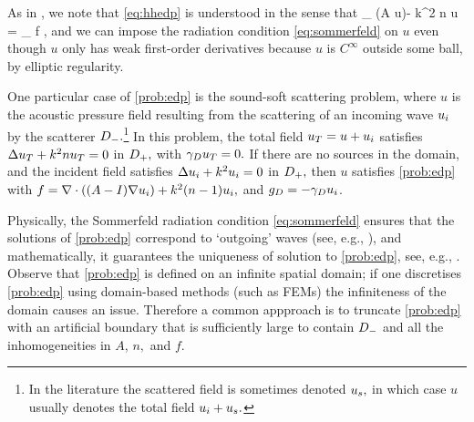 As in \cite[pp. 2874-2875]{GrPeSp:19}, we note that \cref{eq:hhedp} is understood in the sense that
\beqs
\int_{\Dp} \mleft(A \grad u\mright)\cdot \grad \phibar - k^2 n u \phibar = \int_{\Dp} f \phibar {} \phi \in \CzinftyDp,
\eeqs
and we can impose the radiation condition \cref{eq:sommerfeld} on $u$ even though $u$ only has weak first-order derivatives because $u$ is $C^\infty$ outside some ball, by elliptic regularity.

One particular case of \cref{prob:edp} is the sound-soft scattering problem, where $u$ is the acoustic pressure field resulting from the scattering of an incoming wave $u_{i}$ by the scatterer $D_{-}.$\footnote{In the literature the scattered field is sometimes denoted $u_{s},$ in which case $u$ usually denotes the total field $u_{i}+ u_{s}.$} In this problem, the total field $u_{T} = u + u_{i}$ satisfies $\Delta u_{T} + k^2nu_{T} = 0$ in $D_{+},$ with $\gamma_{D} u_{T} = 0.$ If there are no sources in the domain, and the incident field satisfies $\Delta u_{i} + k^2 u_{i} = 0$ in $D_{+},$ then $u$ satisfies \cref{prob:edp} with $f = \grad \cdot \mleft(\mleft(A-I\mright) \grad \ui\mright) + k^2 \mleft(n-1\mright)\ui,$ and $g_{D} = - \gamma_{D} u_{i}$.

Physically, the Sommerfeld radiation condition \eqref{eq:sommerfeld} ensures that the solutions of \cref{prob:edp} correspond to `outgoing' waves (see, e.g., \cite[Section 1.1.3]{Ih:98}), and mathematically, it guarantees the uniqueness of solution to \cref{prob:edp}, see, e.g., \cite[p. 16]{CoKr:13}. Observe that \cref{prob:edp} is defined on an infinite spatial domain; if one discretises \cref{prob:edp} using domain-based methods (such as FEMs) the infiniteness of the domain causes an issue. Therefore a common appproach is to truncate \cref{prob:edp} with an artificial boundary that is sufficiently large to contain $D_{-}$ and all the inhomogeneities in $A$, $n,$ and $f.$

